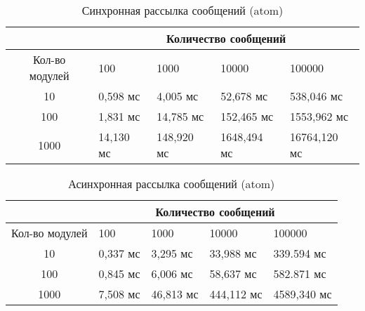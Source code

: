 \begin{table}[!htbp]
    \caption{\label{tab:atom_rrc_old}Синхронная рассылка сообщений (atom)}
    \begin{center}
        \begin{tabularx}{\textwidth}{|c|X|X|X|X|}
            \hline
            & \multicolumn{4}{|c|}{Количество сообщений} \\
            \hline
            Кол-во модулей & 100   & 1000   & 10000   & 100000   \\
            \hline
            10             & 0,598 мс  & 4,005 мс   & 52,678 
            мс   & 538,046 мс   \\
            \hline
            100            & 1,831 мс  & 14,785 мс  & 152,465 
            мс  & 1553,962 мс  \\
            \hline
            1000           & 14,130 мс & 148,920 мс & 1648,494 
            мс & 16764,120  мс \\
            \hline
        \end{tabularx}
    \end{center}
\end{table}


\begin{table}[!htbp]
    \caption{\label{tab:atom_rrc}Асинхронная рассылка сообщений (atom)}
    \begin{center}
        \begin{tabularx}{\textwidth}{|c|X|X|X|X|}
            \hline
            & \multicolumn{4}{|c|}{Количество сообщений} \\
            \hline
            Кол-во модулей & 100   & 1000   & 10000   & 100000   \\
            \hline
            10             & 0,337 мс  & 3,295 мс   & 33,988 
            мс   & 339.594 мс   \\
            \hline
            100            & 0,845 мс  & 6,006 мс  & 58,637 мс  
            & 582.871 мс  \\
            \hline
            1000           & 7,508 мс & 46,813 мс & 444,112 мс & 
            4589,340  мс \\
            \hline
        \end{tabularx}
    \end{center}
\end{table}


